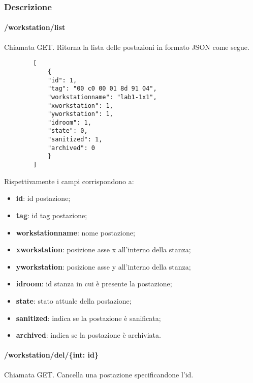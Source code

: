 \subsubsection{Descrizione}
\paragraph{/workstation/list}
Chiamata GET. Ritorna la lista delle postazioni in formato JSON come segue.	\\
\begin{center}
	\begin{lstlisting}
		[
			{
			"id": 1, 
			"tag": "00 c0 00 01 8d 91 04",
			"workstationname": "lab1-1x1",
			"xworkstation": 1, 
			"yworkstation": 1, 
			"idroom": 1,
			"state": 0,
			"sanitized": 1,
			"archived": 0
			}
		]
	\end{lstlisting}
\end{center}
Rispettivamente i campi corrispondono a:
\begin{itemize}
	\item \textbf{id}: id postazione;
	\item \textbf{tag}: id tag postazione;
	\item \textbf{workstationname}: nome postazione;
	\item \textbf{xworkstation}: posizione asse x all'interno della stanza;
	\item \textbf{yworkstation}: posizione asse y all'interno della stanza;	
	\item \textbf{idroom}: id stanza in cui è presente la postazione;	
	\item \textbf{state}: stato attuale della postazione;	
	\item \textbf{sanitized}: indica se la postazione è sanificata;	
	\item \textbf{archived}: indica se la postazione è archiviata.	
\end{itemize}
\paragraph{/workstation/del/\{int: id\}}
Chiamata GET. Cancella una postazione specificandone l'id.

